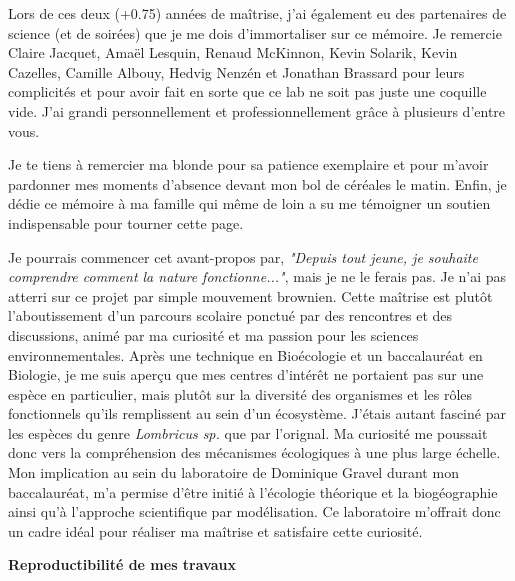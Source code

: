 
Lors de ces deux (+0.75) années de maîtrise, j'ai également eu des partenaires de science (et de
soirées) que je me dois d'immortaliser sur ce mémoire. Je remercie Claire Jacquet, Amaël Lesquin,
Renaud McKinnon, Kevin Solarik, Kevin Cazelles, Camille Albouy, Hedvig Nenzén et Jonathan Brassard
pour leurs complicités et pour avoir fait en sorte que ce lab ne soit pas juste une coquille vide.
J'ai grandi personnellement et professionnellement grâce à plusieurs d'entre vous.  

Je te tiens à remercier ma blonde pour sa patience exemplaire et pour m'avoir pardonner mes moments
d'absence devant mon bol de céréales le matin. Enfin, je dédie ce mémoire à ma famille qui même de
loin a su me témoigner un soutien indispensable pour tourner cette page. 


\avantpropos


Je pourrais commencer cet avant-propos par, \textit{"Depuis tout jeune, je souhaite comprendre
comment la nature fonctionne..."}, mais je ne le ferais pas. Je n'ai pas atterri sur ce projet par
simple mouvement brownien. Cette maîtrise est plutôt l'aboutissement d'un parcours scolaire ponctué
par des rencontres et des discussions, animé par ma curiosité et ma passion pour les sciences
environnementales. Après une technique en Bioécologie et un baccalauréat en Biologie, je me suis
aperçu que mes centres d'intérêt ne portaient pas sur une espèce en particulier, mais plutôt sur la
diversité des organismes et les rôles fonctionnels qu'ils remplissent au sein d'un écosystème.
J'étais autant fasciné par les espèces du genre \textit{Lombricus sp.} que par l'orignal. Ma
curiosité me poussait donc vers la compréhension des mécanismes écologiques à une plus large
échelle. Mon implication au sein du laboratoire de Dominique Gravel durant mon baccalauréat, m'a
permise d'être initié à l'écologie théorique et la biogéographie ainsi qu'à l'approche scientifique
par modélisation. Ce laboratoire m'offrait donc un cadre idéal pour réaliser ma maîtrise et
satisfaire cette curiosité. 

\noindent\textbf{Reproductibilité de mes travaux}

